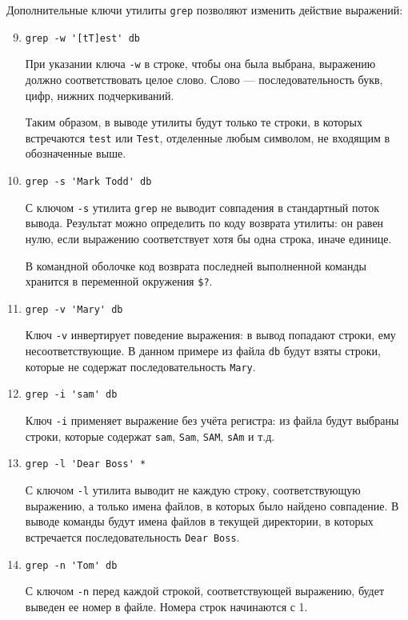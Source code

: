 \documentclass[listings]{labreport}
\begin{document}
\newpage
Дополнительные ключи утилиты \verb|grep| позволяют изменить действие выражений:

\begin{enumerate}
\setcounter{enumi}{8}

\item \verb|grep -w '[tT]est' db|

При указании ключа \texttt{-w} в строке, чтобы она была выбрана, выражению должно соответствовать целое слово.
Слово — последовательность букв, цифр, нижних подчеркиваний.

Таким образом, в выводе утилиты будут только те строки, в которых встречаются \texttt{test} или \texttt{Test}, отделенные
любым символом, не входящим в обозначенные выше.

\item \verb|grep -s 'Mark Todd' db|

С ключом \verb|-s| утилита \texttt{grep} не выводит совпадения в стандартный поток вывода. Результат можно определить
по коду возврата утилиты: он равен нулю, если выражению соответствует хотя бы одна строка, иначе единице. 

\begin{small}
В командной оболочке код возврата последней выполненной команды хранится в переменной окружения \verb|$?|.
\end{small}

\item \verb|grep -v 'Mary' db|

Ключ \verb|-v| инвертирует поведение выражения: в вывод попадают строки, ему несоответствующие.
В данном примере из файла \texttt{db} будут взяты строки, которые не содержат последовательность \texttt{Mary}.

\item \verb|grep -i 'sam' db|

Ключ \verb|-i| применяет выражение без учёта регистра: из файла будут выбраны строки, которые содержат
\texttt{sam}, \texttt{Sam}, \texttt{SAM}, \texttt{sAm} и т.д.

\item \verb|grep -l 'Dear Boss' *|

С ключом \verb|-l| утилита выводит не каждую строку, соответствующую выражению, а только имена файлов,
в которых было найдено совпадение. В выводе команды будут имена файлов в текущей директории,
в которых встречается последовательность \texttt{Dear Boss}.

\item \verb|grep -n 'Tom' db|

С ключом \verb|-n| перед каждой строкой, соответствующей выражению, будет выведен ее номер в файле.
Номера строк начинаются с 1.

\end{enumerate}
\end{document}
